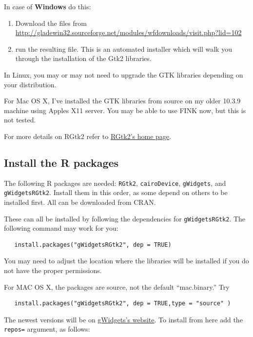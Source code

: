 \documentclass[12pt]{article}
\newcommand{\RCode}[1]{\texttt{#1}}
\begin{document}
In case of \textbf{Windows} do this:

\begin{enumerate}
\item 
 Download the files from
\href{http://gladewin32.sourceforge.net/modules/wfdownloads/visit.php?lid=102}{http://gladewin32.sourceforge.net/modules/wfdownloads/visit.php?lid=102}

\item run the resulting file.  This is an automated installer which will walk
you through the installation of the Gtk2 libraries.
\end{enumerate}

In Linux, you may or may not need to upgrade the GTK libraries
depending on your distribution.

For Mac OS X, I've installed the GTK libraries from source on my older
10.3.9 machine using Apples X11 server. You may be able to use FINK
now, but this is not tested.


For more details on RGtk2 refer to
\href{http://www.ggobi.org/rgtk2}{RGtk2's home page}.


\subsection{Install the R packages}

The following R packages are needed: \texttt{RGtk2},
\texttt{cairoDevice}, \texttt{gWidgets}, and
\texttt{gWidgetsRGtk2}. Install them in this order, as some depend on
others to be installed first. All can be downloaded from CRAN.

These can all be installed by following the dependencies for
\RCode{gWidgetsRGtk2}. The following command may work for you:

\begin{verbatim}
   install.packages("gWidgetsRGtk2", dep = TRUE)
\end{verbatim}

You may need to adjust the location where the libraries will be
installed if you do not have the proper permissions.

For MAC OS X, the packages are source, not the default ``mac.binary.'' Try
\begin{verbatim}
   install.packages("gWidgetsRGtk2", dep = TRUE,type = "source" )
\end{verbatim}

The newest versions will be on
\href{http://www.math.csi.cuny.edu/pmg}{gWidgets's website}. To install
from here add the \texttt{repos=} argument, as follows:
\end{document}
